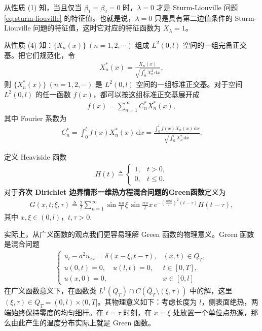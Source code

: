 \documentclass[../../main.tex]{subfiles}%
\begin{document}
\begin{remark}
从性质 (1) 知，当且仅当 $\beta_1=\beta_2=0$ 时，$\lambda=0$ 才是 Sturm-Liouville 问题 \eqref{eq:sturm-liouville} 的特征值。也就是说，$\lambda=0$ 只是具有第二边值条件的 Sturm-Liouville 问题的特征值，这时它对应的特征函数为 $X_\lambda=1$。
\end{remark}
\begin{remark}
从性质 (4) 知：$\{X_n(x)\}\ (n=1,2,\cdots)$ 组成 $L^2(0,l)$ 空间的一组完备正交基。把它们规范化，令
\begin{align*}
X_n^*(x)=\frac{X_n(x)}{\sqrt{\int_0^l X_n^2\,\mathrm{d}x}},
\end{align*}
则 $\{X_n^*(x)\}\ (n=1,2,\cdots)$ 是 $L^2(0,l)$ 空间的一组标准正交基。对于空间 $L^2(0,l)$ 的任一函数 $f(x)$，都可以按这组标准正交基展开成
\begin{align*}
f(x)=\sum_{n=1}^{\infty}C_n^*X_n^*(x),
\end{align*}
其中 Fourier 系数为
\begin{align*}
C_n^*=\int_0^l f(x)X_n^*(x)\,\mathrm{d}x=\frac{\int_0^l f(x)X_n(x)\,\mathrm{d}x}{\sqrt{\int_0^l X_n^2\,\mathrm{d}x}}.
\end{align*}
\end{remark}

\begin{definition}
定义 Heaviside 函数
\begin{align}
H(t)\triangleq 
\begin{cases}
1, & t>0,\\
0, & t\leqslant 0.
\end{cases} \label{def:heaviside}
\end{align}
对于\textbf{齐次 Dirichlet 边界情形一维热方程混合问题的Green函数}定义为
\begin{align}
G(x,t;\xi,\tau)\triangleq \frac{2}{l}\sum_{n=1}^{\infty}\sin\frac{n\pi}{l}\xi\,\sin\frac{n\pi}{l}x\,e^{-\left(\frac{n\pi a}{l}\right)^2(t-\tau)}H(t-\tau), \label{def:green-heat}
\end{align}
其中 $x,\xi\in(0,l)$，$t,\tau>0$.
\end{definition}
\begin{remark}
实际上，从广义函数的观点我们更容易理解 Green 函数的物理意义。Green 函数是混合问题
\begin{align*}
\begin{cases}
u_t-a^2u_{xx}=\delta(x-\xi,t-\tau), & (x,t)\in Q_T,\\
u(0,t)=0,\quad u(l,t)=0, & t\in[0,T],\\
u(x,0)=0, & x\in[0,l]
\end{cases}
\end{align*}
在广义函数意义下，在函数类 $L^1(Q_T)\cap C(\overline{Q}_T\setminus(\xi,\tau))$ 中的解，这里 $(\xi,\tau)\in Q_T=(0,l)\times(0,T]$。其物理意义如下：考虑长度为 $l$，侧表面绝热，两端始终保持零度的均匀细杆。在 $t=\tau$ 时刻，在 $x=\xi$ 处放置一个单位点热源，那么由此产生的温度分布实际上就是 Green 函数。
\end{remark}
\end{document}
